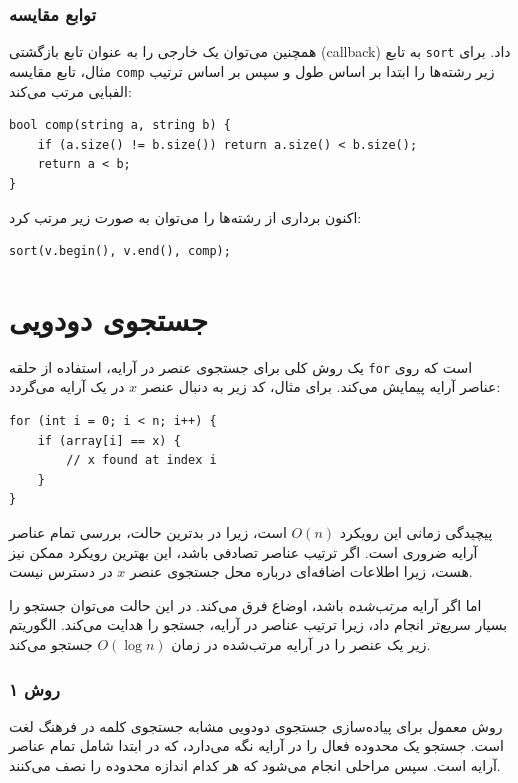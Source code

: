 \subsubsection{توابع مقایسه}


همچنین می‌توان یک  خارجی را به عنوان تابع بازگشتی (callback)
به تابع \texttt{sort} داد.
برای مثال، تابع مقایسه \texttt{comp} زیر
رشته‌ها را ابتدا بر اساس طول و سپس بر اساس ترتیب الفبایی مرتب می‌کند:

\begin{lstlisting}
bool comp(string a, string b) {
    if (a.size() != b.size()) return a.size() < b.size();
    return a < b;
}
\end{lstlisting}
اکنون برداری از رشته‌ها را می‌توان به صورت زیر مرتب کرد:
\begin{lstlisting}
sort(v.begin(), v.end(), comp);
\end{lstlisting}

\section{جستجوی دودویی}


یک روش کلی برای جستجوی عنصر در آرایه،
استفاده از حلقه \texttt{for} است که روی عناصر آرایه پیمایش می‌کند.
برای مثال، کد زیر به دنبال عنصر $x$ در یک آرایه می‌گردد:

\begin{lstlisting}
for (int i = 0; i < n; i++) {
    if (array[i] == x) {
        // x found at index i
    }
}
\end{lstlisting}

پیچیدگی زمانی این رویکرد $O(n)$ است،
زیرا در بدترین حالت، بررسی تمام عناصر آرایه ضروری است.
اگر ترتیب عناصر تصادفی باشد، این بهترین رویکرد ممکن نیز هست،
زیرا اطلاعات اضافه‌ای درباره محل جستجوی عنصر $x$ در دسترس نیست.

اما اگر آرایه \emph{مرتب‌شده} باشد،
اوضاع فرق می‌کند.
در این حالت می‌توان جستجو را بسیار سریع‌تر انجام داد،
زیرا ترتیب عناصر در آرایه، جستجو را هدایت می‌کند.
الگوریتم  زیر
یک عنصر را در آرایه مرتب‌شده در زمان $O(\log n)$ جستجو می‌کند.

\subsubsection{روش ۱}

روش معمول برای پیاده‌سازی جستجوی دودویی
مشابه جستجوی کلمه در فرهنگ لغت است.
جستجو یک محدوده فعال را در آرایه نگه می‌دارد،
که در ابتدا شامل تمام عناصر آرایه است.
سپس مراحلی انجام می‌شود
که هر کدام اندازه محدوده را نصف می‌کنند.

